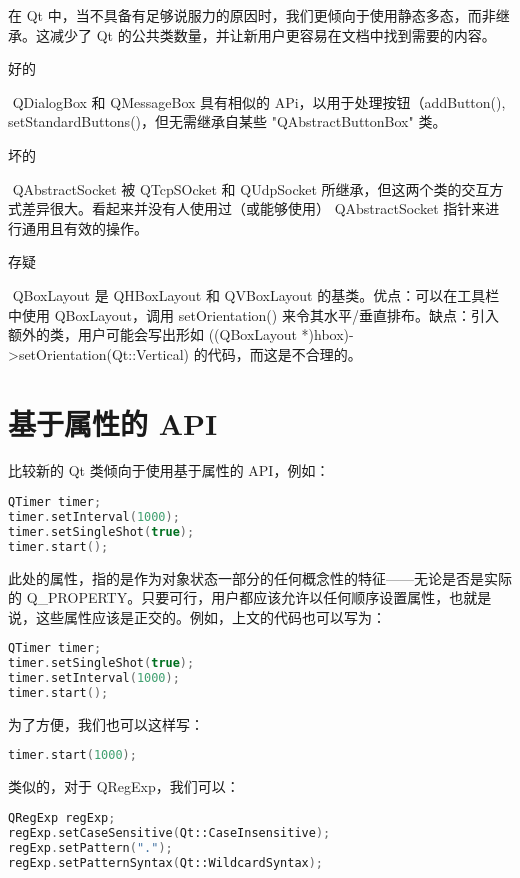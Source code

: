 在 Qt 中，当不具备有足够说服力的原因时，我们更倾向于使用静态多态，而非继承。这减少了 Qt 的公共类数量，并让新用户更容易在文档中找到需要的内容。

好的

​ QDialogBox 和 QMessageBox 具有相似的 APi，以用于处理按钮（addButton(), setStandardButtons()，但无需继承自某些 "QAbstractButtonBox" 类。

坏的

​ QAbstractSocket 被 QTcpSOcket 和 QUdpSocket 所继承，但这两个类的交互方式差异很大。看起来并没有人使用过（或能够使用） QAbstractSocket 指针来进行通用且有效的操作。

存疑

​ QBoxLayout 是 QHBoxLayout 和 QVBoxLayout 的基类。优点：可以在工具栏中使用 QBoxLayout，调用 setOrientation() 来令其水平/垂直排布。缺点：引入额外的类，用户可能会写出形如 ((QBoxLayout *)hbox)->setOrientation(Qt::Vertical) 的代码，而这是不合理的。

\section{基于属性的 API}

比较新的 Qt 类倾向于使用基于属性的 API，例如：

\begin{lstlisting}[language=C++]
QTimer timer;
timer.setInterval(1000);
timer.setSingleShot(true);
timer.start();
\end{lstlisting}

此处的属性，指的是作为对象状态一部分的任何概念性的特征——无论是否是实际的 Q\_PROPERTY。只要可行，用户都应该允许以任何顺序设置属性，也就是说，这些属性应该是正交的。例如，上文的代码也可以写为：

\begin{lstlisting}[language=C++]
QTimer timer;
timer.setSingleShot(true);
timer.setInterval(1000);
timer.start();
\end{lstlisting}

为了方便，我们也可以这样写：

\begin{lstlisting}[language=C++]
timer.start(1000);
\end{lstlisting}

类似的，对于 QRegExp，我们可以：

\begin{lstlisting}[language=C++]
QRegExp regExp;
regExp.setCaseSensitive(Qt::CaseInsensitive);
regExp.setPattern(".");
regExp.setPatternSyntax(Qt::WildcardSyntax);
\end{lstlisting}

